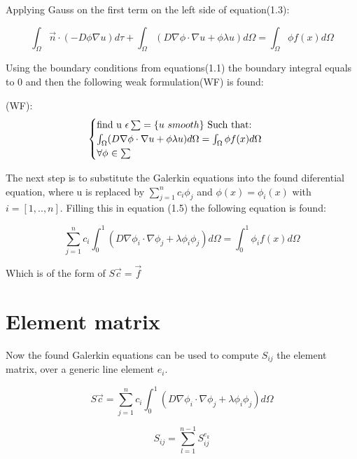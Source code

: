 \documentclass[a4paper]{report}
\begin{document}
Applying Gauss on the first term on the left side of equation(1.3):


\begin{equation}
	\int_{\Omega}  \vec{n}\cdot(-D\phi \nabla u) d\tau + \int_{\Omega}  (D\nabla\phi\cdot\nabla u +\phi\lambda u )d\Omega = \int_{\Omega} \phi f(x) d\Omega 
\end{equation}
\smallskip

Using the boundary conditions from equations(1.1) the boundary integral equals to 0 and then the following weak formulation(WF) is found: \vspace{5mm}


(WF): \begin{equation}
\begin{cases} 
	$find u $\epsilon \sum =\{u$ $ smooth\}$ Such that:$ \\ \int_{\Omega}  (D\nabla\phi\cdot\nabla u +\phi\lambda u )d\Omega = \int_{\Omega} \phi f(x) d\Omega \\ \forall\phi $ $ \in\sum 
\end{cases}\  
\end{equation}

\bigskip
The next step is to substitute the Galerkin equations into the found diferential equation, where u is replaced by $ \sum_{j=1}^{n}c_i\phi_j $ and  $\phi(x)=\phi_i(x)$ with $i = [1,..,n]$. Filling this in equation (1.5) the following equation is found:

\begin{equation}
	\sum_{j=1}^{n}c_i\int_{0}^{1} (D\nabla\phi_i\cdot\nabla\phi_j +\lambda\phi_i\phi_j )d\Omega = \int_{0}^{1} \phi_i f(x) d\Omega
\end{equation}
\medskip

Which is of the form of $ S\vec{c} = \vec{f} $

\section{Element matrix}\label{Element_matrix}
Now the found Galerkin equations can be used to compute $ S_{ij}$  the element matrix, over a generic line element $ e_i$.

\begin{equation}
S\vec{c}=	\sum_{j=1}^{n}c_i\int_{0}^{1} (D\nabla\phi_i\cdot\nabla\phi_j +\lambda\phi_i\phi_j )d\Omega
\end{equation}

\begin{equation}
S_{ij} =\sum_{l=1}^{n-1} S^{e_k}_{ij} 
\end{equation}
\medskip
\end{document}
